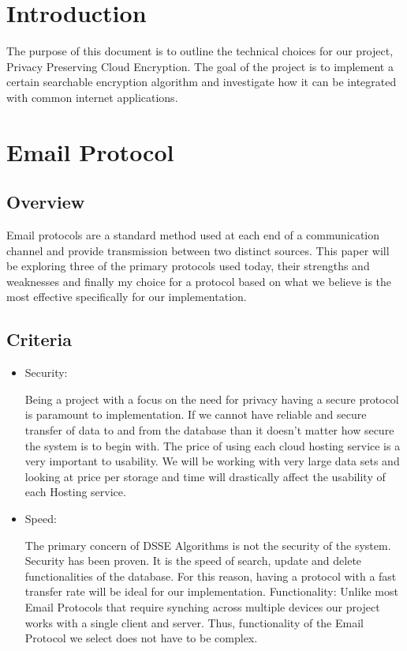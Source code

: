 \section{ Introduction }

The purpose of this document is to outline the technical choices for our project, Privacy Preserving Cloud Encryption. The goal of the project is to implement a certain searchable encryption algorithm and investigate how it can be integrated with common internet applications.


\section{ Email Protocol }

\subsection{ Overview }

Email protocols are a standard method used at each end of a communication channel and provide transmission between two distinct sources. This paper will be exploring three of the primary protocols used today, their strengths and weaknesses and finally my choice for a protocol based on what we believe is the most effective specifically for our implementation.
\subsection{ Criteria }

\begin{itemize}
  \item Security:
  
Being a project with a focus on the need for privacy having a secure protocol is paramount to implementation. If we cannot have reliable and secure transfer of data to and from the database than it doesn’t matter how secure the system is to begin with.
The price of using each cloud hosting service is a very important to usability. We will be working with very large data sets and looking at price per storage and time will drastically affect the usability of each Hosting service.

  \item Speed:
  
The primary concern of DSSE Algorithms is not the security of the system. Security has been proven. It is the speed of search, update and delete functionalities of the database. For this reason, having a protocol with a fast transfer rate will be ideal for our implementation.
Functionality: Unlike most Email Protocols that require synching across multiple devices our project works with a single client and server. Thus, functionality of the Email Protocol we select does not have to be complex.

\end{itemize}


